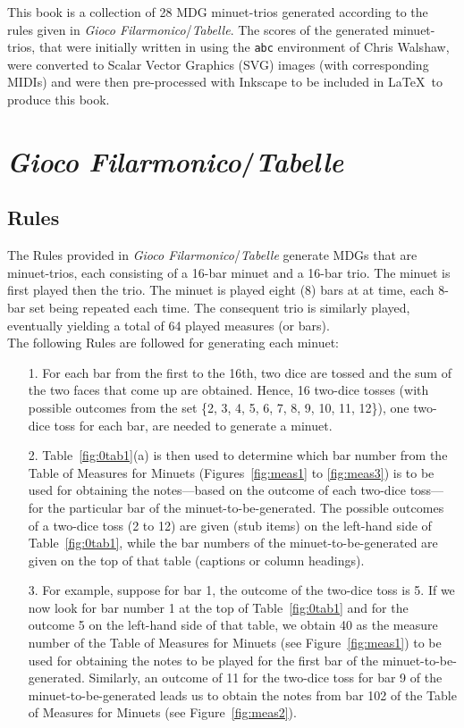 \documentclass[a4paper,x11names,svgnames,10pt]{article}
\begin{document}
{This book is a collection of 28 MDG minuet-trios generated according to the rules given in {\it Gioco Filarmonico}/{\it Tabelle}.  The scores of the generated minuet-trios, that were initially written in using the \texttt{abc} environment of Chris Walshaw, were converted to Scalar Vector Graphics (SVG) images (with corresponding MIDIs) and were then pre-processed with Inkscape to be included in \LaTeX\ to produce this book.


\section{{\em Gioco Filarmonico}/{\em Tabelle}}

\subsection{Rules}

The Rules provided in {\em Gioco Filarmonico}/{\em Tabelle} generate MDGs that are minuet-trios, each consisting of a 16-bar minuet and a 16-bar trio.  The minuet is first played then the trio. The minuet is played eight (8)  bars at at time, each 8-bar set being repeated each time.  The consequent trio is similarly played, eventually yielding a total of 64 played measures (or bars). \\

The following Rules are followed for generating each minuet:
\begin{enumerate}
	\item [1.] For each bar from the first to the 16th, two dice are tossed and the sum of the two faces that come up are obtained.  Hence, 16 two-dice tosses (with possible outcomes from the set \{2, 3, 4, 5, 6, 7, 8, 9, 10, 11, 12\}), one two-dice toss for each bar, are needed to generate a minuet.   
	\item [2.] Table~\ref{fig:0tab1}(a) is then used to determine which bar number from the Table of Measures for Minuets (Figures~\ref{fig:meas1} to \ref{fig:meas3}) is to be used for obtaining the notes---based on the outcome of each two-dice toss---for the particular bar of the minuet-to-be-generated.  The possible outcomes of a two-dice toss (2 to 12) are given (stub items) on the left-hand side of Table~\ref{fig:0tab1}, while the bar numbers of the minuet-to-be-generated are given on the top of that table (captions or column  headings).
	\item [3.]  For example, suppose for bar 1, the outcome of the two-dice toss is 5.  If we now look for bar number 1 at the top of Table~\ref{fig:0tab1} and for the outcome 5 on the left-hand side of that table, we obtain 40 as the measure number of the Table of Measures for Minuets (see Figure~\ref{fig:meas1}) to be used for obtaining the notes to be played for the first bar of the minuet-to-be-generated.  Similarly, an outcome of 11 for the two-dice toss for bar 9 of the minuet-to-be-generated leads us to obtain the notes from bar 102 of the Table of Measures for Minuets (see Figure~\ref{fig:meas2}).
\end{enumerate}   

}
\end{document}
